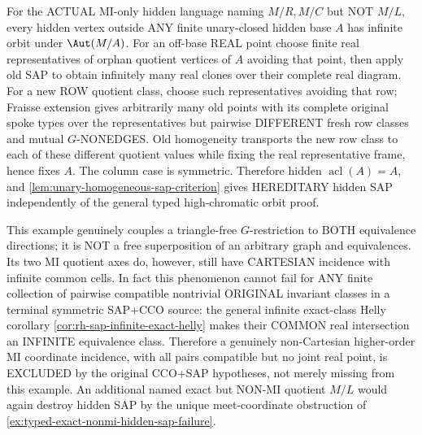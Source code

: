 \begin{example}
For the ACTUAL MI-only hidden language
naming $M/R,M/C$ but NOT $M/L$,
every hidden vertex outside ANY
finite unary-closed hidden base $A$
has infinite orbit under
$\Aut(M/A)$. For an off-base REAL
point choose finite real representatives
of orphan quotient vertices of $A$
avoiding that point, then apply old
SAP to obtain infinitely many
real clones over their complete
real diagram. For a new ROW quotient
class, choose such representatives
avoiding that row; Fraisse extension
gives arbitrarily many old points
with its complete original spoke
types over the representatives but
pairwise DIFFERENT fresh row classes
and mutual $G$-NONEDGES.
Old homogeneity transports the
new row class to each of these
different quotient values while
fixing the real representative
frame, hence fixes $A$.
The column case is symmetric.
Therefore hidden
$\operatorname{acl}(A)=A$,
and \cref{lem:unary-homogeneous-sap-criterion}
gives HEREDITARY hidden SAP
independently of the general
typed high-chromatic orbit proof.

This example genuinely couples
a triangle-free $G$-restriction
to BOTH equivalence directions;
it is NOT a free superposition of
an arbitrary graph and equivalences.
Its two MI quotient axes do,
however, still have CARTESIAN
incidence with infinite common cells.
In fact this phenomenon cannot
fail for ANY finite collection of
pairwise compatible nontrivial
ORIGINAL invariant classes in a
terminal symmetric SAP+CCO source:
the general infinite exact-class
Helly corollary
\cref{cor:rh-sap-infinite-exact-helly}
makes their COMMON real intersection
an INFINITE equivalence class.
Therefore a genuinely non-Cartesian
higher-order MI coordinate incidence,
with all pairs compatible but no
joint real point, is EXCLUDED by
the original CCO+SAP hypotheses,
not merely missing from this example.
An additional named exact but
NON-MI quotient $M/L$ would again
destroy hidden SAP by the unique
meet-coordinate obstruction of
\cref{ex:typed-exact-nonmi-hidden-sap-failure}.
\end{example}

